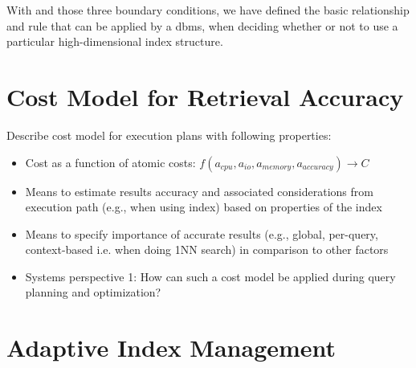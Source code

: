 With  and those three boundary conditions, we have defined the basic relationship and rule that can be applied by a \acrshort{dbms}, when deciding whether or not to use a particular high-dimensional index structure.

\pagebreak


\section{Cost Model for Retrieval Accuracy}
Describe cost model for execution plans with following properties:

\begin{itemize}
    \item Cost as a function of atomic costs: $f(a_{cpu}, a_{io}, a_{memory}, a_{accuracy}) \longrightarrow C$
    \item Means to estimate results accuracy and associated considerations from execution path (e.g., when using index) based on properties of the index
    \item Means to specify importance of accurate results (e.g., global, per-query, context-based i.e. when doing 1NN search) in comparison to other factors
    \item Systems perspective 1: How can such a cost model be applied during query planning and optimization?
\end{itemize}

\section{Adaptive Index Management}

